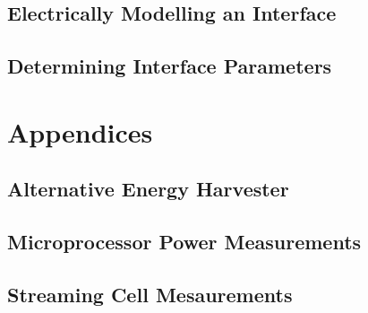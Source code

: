     \chapter{Electrically Modelling an Interface}
        
    \chapter{Determining Interface Parameters}
        

\part{Appendices}
    \appendix
    \chapter{Alternative Energy Harvester}
        
    \chapter{Microprocessor Power Measurements}
        
    \chapter{Streaming Cell Mesaurements}
        







